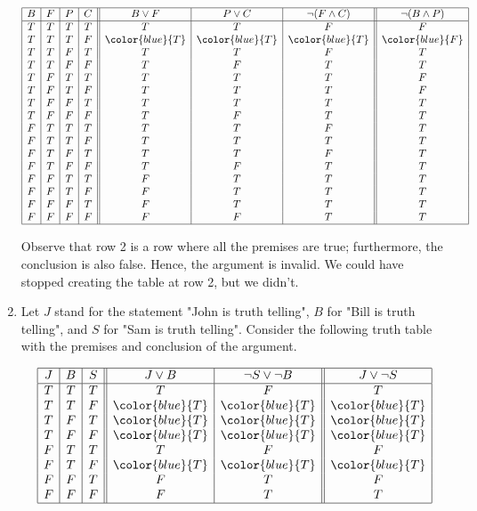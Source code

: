 \begin{enumerate}[label=(\alph*)]
\[
\begin{array}{|c|c|c|c||c|c|c||c|}
\hline
B & F & P & C & B \vee F & P \vee C & \neg (F \wedge C) & \neg (B \wedge P) \\
\hline
T & T & T & T & T & T & F & F \\
T & T & T & F & \color{blue}{T} & \color{blue}{T} & \color{blue}{T} & \color{blue}{F} \\
T & T & F & T & T & T & F & T \\
T & T & F & F & T & F & T & T \\
T & F & T & T & T & T & T & F \\
T & F & T & F & T & T & T & F \\
T & F & F & T & T & T & T & T \\
T & F & F & F & T & F & T & T \\
F & T & T & T & T & T & F & T \\
F & T & T & F & T & T & T & T \\
F & T & F & T & T & T & F & T \\
F & T & F & F & T & F & T & T \\
F & F & T & T & F & T & T & T \\
F & F & T & F & F & T & T & T \\
F & F & F & T & F & T & T & T \\
F & F & F & F & F & F & T & T \\
\hline
\end{array}
\]

Observe that row 2 is a row where all the premises are true; furthermore, the conclusion is also false. Hence, the argument is invalid. We could have stopped creating the table at row 2, but we didn't.

\pagebreak

\item Let $J$ stand for the statement "John is truth telling", $B$ for "Bill is truth telling", and $S$ for "Sam is truth telling". Consider the following truth table with the premises and conclusion of the argument.

\[
\begin{array}{|c|c|c||c|c||c|}
\hline
J & B & S & J \vee B & \neg S \vee \neg B & J \vee \neg S \\
\hline
T & T & T & T & F & T \\
T & T & F & \color{blue}{T} & \color{blue}{T} & \color{blue}{T} \\
T & F & T & \color{blue}{T} & \color{blue}{T} & \color{blue}{T} \\
T & F & F & \color{blue}{T} & \color{blue}{T} & \color{blue}{T} \\
F & T & T & T & F & F \\
F & T & F & \color{blue}{T} & \color{blue}{T} & \color{blue}{T} \\
F & F & T & F & T & F \\
F & F & F & F & T & T \\
\hline
\end{array}
\]


\end{enumerate}
